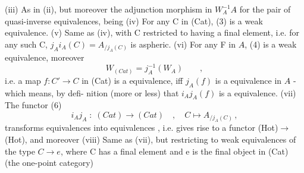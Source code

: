 
\margin{\textcircled{}}(iii) As in (ii), but moreover the adjunction morphism in $W_A^{-1}A\hat{}$ for
the pair of quasi-inverse equivalences, being 
(iv) For any C in (Cat), (3) is a weak equivalence.
\margin{\textcircled{}}(v) Same as (iv), with C restricted to having a final element, i.e.
for any such C, $j_Ai_A(C) = A_{/j_A(C)}$ is aspheric.
(vi) For any F in $A\hat{}$, (4) is a weak equivalence, moreover
\[ W_{(Cat)} = j_A^{-1}(W_A) \qquad , \]
i.e. a  map $f\colon C' \to C$ in (Cat) is a equivalence,
iff $j_A(f)$ is a equivalence in $A\hat{}$ - which means, by defi-%
nition (more or less) that $i_Aj_A(f)$ is a equivalence.
(vii) The functor
(6) \[ i_Aj_A \; : \; (Cat) \longrightarrow (Cat) \quad , \quad C \mapsto A_{/j_A(C)} \, , \]
transforms equivalences into equivalences , i.e.
gives rise to a functor (Hot)$\to$(Hot), and moreover  
 
(viii) Same as (vii), but restricting to  weak equivalences of the
type $C \to e$, where C has a final element and e is the final
object in (Cat) (the one-point category)


